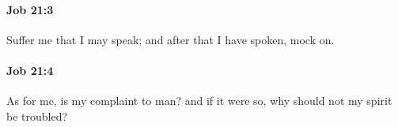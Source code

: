 		\paragraph{Job 21:3} %
			\label{JOB-21-3}

			Suffer me that I may speak; and after that I have spoken, mock on.


		\paragraph{Job 21:4} %
			\label{JOB-21-4}

			As for me, is my complaint to man? and if it were so, why should not my spirit be troubled?


